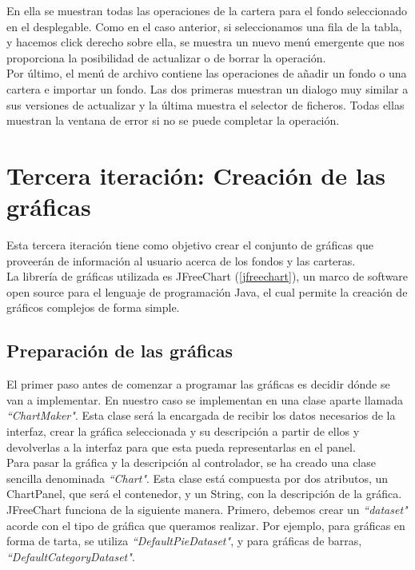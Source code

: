 \documentclass[12pt, a4paper]{book}
\begin{document}
En ella se muestran todas las operaciones de la cartera para el fondo seleccionado en el desplegable. Como en el caso anterior, si seleccionamos una fila de la tabla, y hacemos click derecho sobre ella, se muestra un nuevo menú emergente que nos proporciona la posibilidad de actualizar o de borrar la operación.
\\

Por último, el menú de archivo contiene las operaciones de añadir un fondo o una cartera e importar un fondo. Las dos primeras muestran un dialogo muy similar a sus versiones de actualizar y la última muestra el selector de ficheros. Todas ellas muestran la ventana de error si no se puede completar la operación.




\newpage
\section{Tercera iteración: Creación de las gráficas}

Esta tercera iteración tiene como objetivo crear el conjunto de gráficas que proveerán de información al usuario acerca de los fondos y las carteras.\\

La librería de gráficas utilizada es JFreeChart (\ref{jfreechart}), un marco de software open source para el lenguaje de programación Java, el cual permite la creación de gráficos complejos de forma simple.

\subsection{Preparación de las gráficas}

El primer paso antes de comenzar a programar las gráficas es decidir dónde se van a implementar. En nuestro caso se implementan en una clase aparte llamada \textit{``ChartMaker"}. Esta clase será la encargada de recibir los datos necesarios de la interfaz, crear la gráfica seleccionada y su descripción a partir de ellos y devolverlas a la interfaz para que esta pueda representarlas en el panel.\\

Para pasar la gráfica y la descripción al controlador, se ha creado una clase sencilla denominada \textit{``Chart"}. Esta clase está compuesta por dos atributos, un ChartPanel, que será el contenedor, y un String, con la descripción de la gráfica.\\

JFreeChart funciona de la siguiente manera. Primero, debemos crear un \textit{``dataset"} acorde con el tipo de gráfica que queramos realizar. Por ejemplo, para gráficas en forma de tarta, se utiliza \textit{``DefaultPieDataset"}, y para gráficas de barras, \textit{``DefaultCategoryDataset"}.\\
\end{document}

